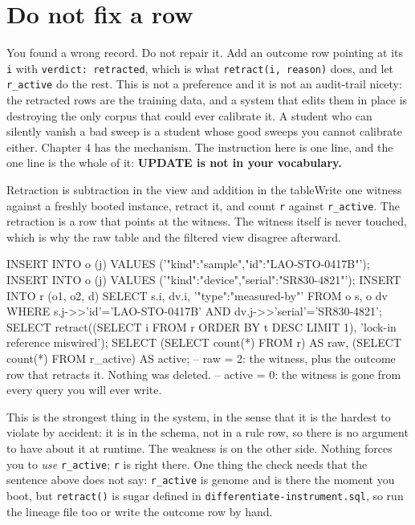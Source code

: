 \section{Do not fix a row}

You found a wrong record. Do not repair it. Add an outcome row pointing at its \texttt{i} with \texttt{verdict: retracted}, which is what \texttt{retract(i, reason)} does, and let \texttt{r\_active} do the rest. This is not a preference and it is not an audit-trail nicety: the retracted rows are the training data, and a system that edits them in place is destroying the only corpus that could ever calibrate it. A student who can silently vanish a bad sweep is a student whose good sweeps you cannot calibrate either. Chapter 4 has the mechanism. The instruction here is one line, and the one line is the whole of it: \textbf{UPDATE is not in your vocabulary.}

\begin{Correspondence}{Retraction is subtraction in the view and addition in the table}{Write one witness against a freshly booted instance, retract it, and count \texttt{r} against \texttt{r\_active}.}
The retraction is a row that points at the witness. The witness itself is never touched, which is why the raw table and the filtered view disagree afterward.
\begin{Check}
INSERT INTO o (j) VALUES ('{"kind":"sample","id":"LAO-STO-0417B"}');
INSERT INTO o (j) VALUES ('{"kind":"device","serial":"SR830-4821"}');
INSERT INTO r (o1, o2, d)
  SELECT s.i, dv.i, '{"type":"measured-by"}'
  FROM o s, o dv
  WHERE s.j->>'id'='LAO-STO-0417B' AND dv.j->>'serial'='SR830-4821';
SELECT retract((SELECT i FROM r ORDER BY t DESC LIMIT 1), 'lock-in reference miswired');
SELECT (SELECT count(*) FROM r) AS raw,
       (SELECT count(*) FROM r_active) AS active;
-- raw = 2: the witness, plus the outcome row that retracts it. Nothing was deleted.
-- active = 0: the witness is gone from every query you will ever write.
\end{Check}
This is the strongest thing in the system, in the sense that it is the hardest to violate by accident: it is in the schema, not in a rule row, so there is no argument to have about it at runtime. The weakness is on the other side. Nothing forces you to \emph{use} \texttt{r\_active}; \texttt{r} is right there. One thing the check needs that the sentence above does not say: \texttt{r\_active} is genome and is there the moment you boot, but \texttt{retract()} is sugar defined in \texttt{differentiate-instrument.sql}, so run the lineage file too or write the outcome row by hand.
\end{Correspondence}

